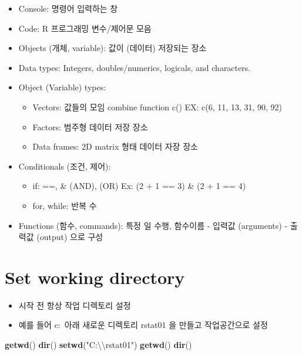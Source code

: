 \documentclass[]{book}
\newenvironment{Shaded}{\begin{snugshade}}{\end{snugshade}}
\newcommand{\KeywordTok}[1]{\textcolor[rgb]{0.13,0.29,0.53}{\textbf{#1}}}
\newcommand{\CharTok}[1]{\textcolor[rgb]{0.31,0.60,0.02}{#1}}
\newcommand{\StringTok}[1]{\textcolor[rgb]{0.31,0.60,0.02}{#1}}
\newcommand{\NormalTok}[1]{#1}
\providecommand{\tightlist}{%
  \setlength{\itemsep}{0pt}\setlength{\parskip}{0pt}}
\begin{document}
\begin{itemize}
\tightlist
\item
  Console: 명령어 입력하는 창
\item
  Code: R 프로그래밍 변수/제어문 모음\\
\item
  Objects (개체, variable): 값이 (데이터) 저장되는 장소
\item
  Data types: Integers, doubles/numerics, logicals, and characters.
\item
  Object (Variable) types:

  \begin{itemize}
  \tightlist
  \item
    Vectors: 값들의 모임 combine function c() EX: c(6, 11, 13, 31, 90, 92)
  \item
    Factors: 범주형 데이터 저장 장소
  \item
    Data frames: 2D matrix 형태 데이터 자장 장소
  \end{itemize}
\item
  Conditionals (조건, 제어):

  \begin{itemize}
  \tightlist
  \item
    if: ==, \& (AND), \textbar{} (OR) Ex: (2 + 1 == 3) \& (2 + 1 == 4)
  \item
    for, while: 반복 수
  \end{itemize}
\item
  Functions (함수, commands): 특정 일 수행, 함수이름 - 입력값 (arguments) - 출력값 (output) 으로 구성
\end{itemize}

\hypertarget{set-working-directory}{%
\section{Set working directory}\label{set-working-directory}}

\begin{itemize}
\tightlist
\item
  시작 전 항상 작업 디렉토리 설정
\item
  예를 들어 c:~아래 새로운 디렉토리 rstat01 을 만들고 작업공간으로 설정
\end{itemize}

\begin{Shaded}
\begin{Highlighting}[]
\KeywordTok{getwd}\NormalTok{()}
\KeywordTok{dir}\NormalTok{()}
\KeywordTok{setwd}\NormalTok{(}\StringTok{"C:}\CharTok{\textbackslash{}\textbackslash{}}\StringTok{rstat01"}\NormalTok{)}
\KeywordTok{getwd}\NormalTok{()}
\KeywordTok{dir}\NormalTok{()}
\end{Highlighting}
\end{Shaded}
\end{document}

